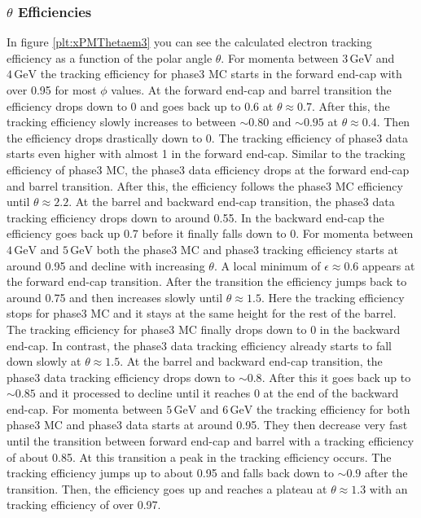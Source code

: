 \documentclass[a4paper,11pt,twosided,final,german,openbib,pdftex,listof=totoc,bibliography=totoc]{scrbook}
\begin{document}
\newpage

\subsubsection{$\theta$ Efficiencies}


In figure \ref{plt:xPMThetaem3} you can see the calculated electron tracking efficiency as a function of the polar angle $\theta$.
For momenta between $3\,\textrm{GeV}$ and $4\,\textrm{GeV}$ the tracking efficiency for phase3 MC starts in the forward end-cap with over 0.95 for most $\phi$ values. At the forward end-cap and barrel transition the efficiency drops down to 0 and goes back up to 0.6 at $\theta \approx 0.7$. After this, the tracking efficiency slowly increases to between $\sim 0.80$ and $\sim 0.95$ at $\theta \approx 0.4$. Then the efficiency drops drastically down to 0. The tracking efficiency of phase3 data starts even higher with almost 1 in the forward end-cap. Similar to the tracking efficiency of phase3 MC, the phase3 data efficiency drops at the forward end-cap and barrel transition. After this, the efficiency follows the phase3 MC efficiency until $\theta \approx 2.2$. At the barrel and backward end-cap transition, the phase3 data tracking efficiency drops down to around 0.55. In the backward end-cap the efficiency goes back up 0.7 before it finally falls down to 0.
For momenta between $4\,\textrm{GeV}$ and $5\,\textrm{GeV}$ both the phase3 MC and phase3 tracking efficiency starts at around 0.95 and decline with increasing $\theta$. A local minimum of $\epsilon \approx 0.6$ appears at the forward end-cap transition. After the transition the efficiency jumps back to around 0.75 and then increases slowly until $\theta \approx 1.5$. Here the tracking efficiency stops for phase3 MC and it stays at the same height for the rest of the barrel. The tracking efficiency for phase3 MC finally drops down to 0 in the backward end-cap. In contrast, the phase3 data tracking efficiency already starts to fall down slowly at $\theta \approx 1.5$. At the barrel and backward end-cap transition, the phase3 data tracking efficiency drops down to $\sim0.8$. After this it goes back up to $\sim0.85$ and it processed to decline until it reaches 0 at the end of the backward end-cap.
For momenta between $5\,\textrm{GeV}$ and $6\,\textrm{GeV}$ the tracking efficiency for both phase3 MC and phase3 data starts at around 0.95. They then decrease very fast until the transition between forward end-cap and barrel with a tracking efficiency of about 0.85. At this transition a peak in the tracking efficiency occurs. The tracking efficiency jumps up to about 0.95 and falls back down to $\sim 0.9$ after the transition. Then, the efficiency goes up and reaches a plateau at $\theta \approx 1.3$ with an tracking efficiency of over 0.97.
\end{document}
